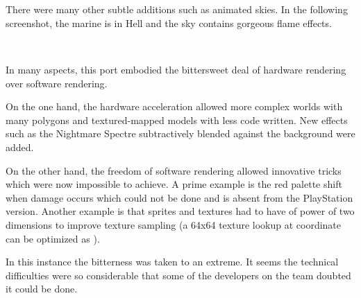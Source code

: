 \\

\\
\par


There were many other subtle additions such as animated skies. In the following screenshot, the marine is in Hell and the sky contains gorgeous flame effects.\\
\par
{}\\
\par
In many aspects, this port embodied the bittersweet deal of hardware rendering over software rendering.\\
\par
On the one hand, the hardware acceleration allowed more complex worlds with many polygons and textured-mapped models with less code written. New effects such as the Nightmare Spectre subtractively blended against the background were added.\\
\par
 On the other hand, the freedom of software rendering allowed innovative tricks which were now impossible to achieve. A prime example is the red palette shift when damage occurs which could not be done and is absent from the PlayStation version. Another example is that sprites and textures had to have of power of two dimensions to improve texture sampling (a 64x64 texture lookup at coordinate  can be optimized as ).\\
\par
In this instance the bitterness was taken to an extreme. It seems the technical difficulties were so considerable that some of the developers on the team doubted it could be done.


